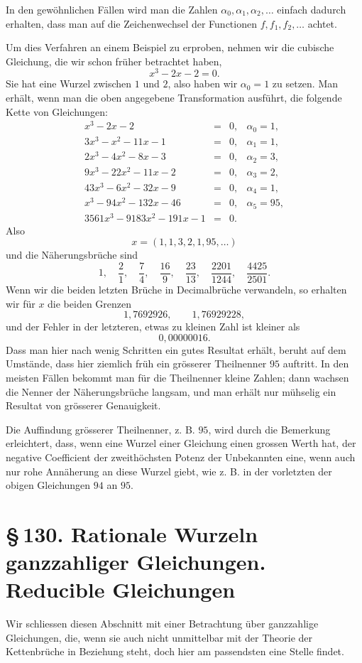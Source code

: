 \documentclass[11pt]{article}
\providecommand{\sect}[2]{\section*{\S\,#1. #2}}
\begin{document}
In den gewöhnlichen Fällen wird man die Zahlen $\alpha_0,\alpha_1,\alpha_2,\ldots$ einfach dadurch erhalten, dass man auf die Zeichenwechsel der Functionen $f,f_1,f_2,\ldots$ achtet.

Um dies Verfahren an einem Beispiel zu erproben, nehmen wir die cubische Gleichung, die wir schon früher betrachtet haben,
\[
        x^3-2x-2=0.
\]
Sie hat eine Wurzel zwischen $1$ und $2$, also haben wir $\alpha_0=1$ zu setzen. Man erhält, wenn man die oben angegebene Transformation ausführt, die folgende Kette von Gleichungen:
\[
\begin{array}{rcll}
x^3-2x-2&=&0,& \alpha_0=1,\\
3x^3-x^2-11x-1&=&0,& \alpha_1=1,\\
2x^3-4x^2-8x-3&=&0,& \alpha_2=3,\\
9x^3-22x^2-11x-2&=&0,& \alpha_3=2,\\
43x^3-6x^2-32x-9&=&0,& \alpha_4=1,\\
x^3-94x^2-132x-46&=&0,& \alpha_5=95,\\
3561x^3-9183x^2-191x-1&=&0.&
\end{array}
\]
Also
\[
        x=(1,1,3,2,1,95,\ldots)
\]
und die Näherungsbrüche sind
\[
        1,\quad \frac21,\quad \frac74,\quad \frac{16}{9},\quad
        \frac{23}{13},\quad \frac{2201}{1244},\quad \frac{4425}{2501}.
\]
Wenn wir die beiden letzten Brüche in Decimalbrüche verwandeln, so erhalten wir für $x$ die beiden Grenzen
\[
        1{,}7692926,\qquad 1{,}76929228,
\]
und der Fehler in der letzteren, etwas zu kleinen Zahl ist kleiner als
\[
        0{,}00000016.
\]
Dass man hier nach wenig Schritten ein gutes Resultat erhält, beruht auf dem Umstände, dass hier ziemlich früh ein grösserer Theilnenner $95$ auftritt. In den meisten Fällen bekommt man für die Theilnenner kleine Zahlen; dann wachsen die Nenner der Näherungsbrüche langsam, und man erhält nur mühselig ein Resultat von grösserer Genauigkeit.

Die Auffindung grösserer Theilnenner, z. B. $95$, wird durch die Bemerkung erleichtert, dass, wenn eine Wurzel einer Gleichung einen grossen Werth hat, der negative Coefficient der zweithöchsten Potenz der Unbekannten eine, wenn auch nur rohe Annäherung an diese Wurzel giebt, wie z. B. in der vorletzten der obigen Gleichungen $94$ an $95$.

\sect{130}{Rationale Wurzeln ganzzahliger Gleichungen. Reducible Gleichungen}

Wir schliessen diesen Abschnitt mit einer Betrachtung über ganzzahlige Gleichungen, die, wenn sie auch nicht unmittelbar mit der Theorie der Kettenbrüche in Beziehung steht, doch hier am passendsten eine Stelle findet.
\end{document}
